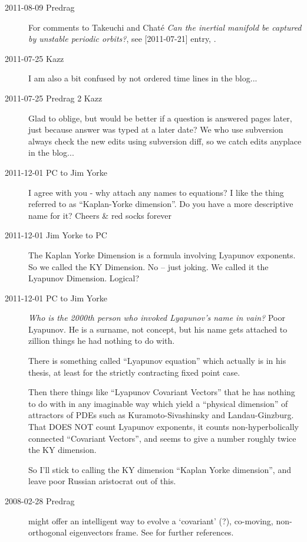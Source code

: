 \begin{description}
\item[2011-08-09 Predrag] For comments to Takeuchi and Chat\'e
\emph{Can the inertial manifold be captured by unstable periodic
orbits?}, see [2011-07-21] entry, .

\item[2011-07-25 Kazz]
I am also a bit confused by not ordered time lines in the blog...

\item[2011-07-25 Predrag 2 Kazz]
Glad to oblige, but would be better if a question is answered pages
later, just because answer was typed at a later date? We who use subversion
always check the new edits using subversion diff, so we catch
edits anyplace in the blog...

\item[2011-12-01 PC to Jim Yorke] I agree with you - why attach any names
to equations? I like the thing referred to as ``Kaplan-Yorke dimension''.
Do you have a more descriptive name for it?
Cheers \& red socks forever

\item[2011-12-01 Jim Yorke to PC] The Kaplan Yorke Dimension is a formula
involving Lyapunov exponents. So we called the KY Dimension. No -- just
joking. We called it the Lyapunov Dimension. Logical?

\item[2011-12-01 PC to Jim Yorke] \emph{Who is the 2000th person who
invoked Lyapunov's name in vain?} Poor Lyapunov. He is a surname, not
concept, but his name gets attached to zillion things he had nothing to
do with.

There is something called ``Lyapunov equation'' which actually is in his
thesis, at least for the strictly contracting fixed point case.

Then there things like ``Lyapunov Covariant Vectors'' that he has nothing
to do with in any imaginable way which yield a ``physical dimension'' of
attractors of PDEs such as Kuramoto-Sivashinsky and Landau-Ginzburg. That
DOES NOT count Lyapunov exponents, it counts non-hyperbolically connected
``Covariant Vectors'', and seems to give a number roughly twice the KY
dimension.

So I'll stick to calling the KY dimension  ``Kaplan Yorke dimension'', and
leave poor Russian aristocrat out of this.


\item[2008-02-28 Predrag]  might offer an
intelligent way to evolve a `covariant' (?), co-moving, non-orthogonal
{\jacobianM} eigenvectors frame. See  for
further references.


\end{description}
